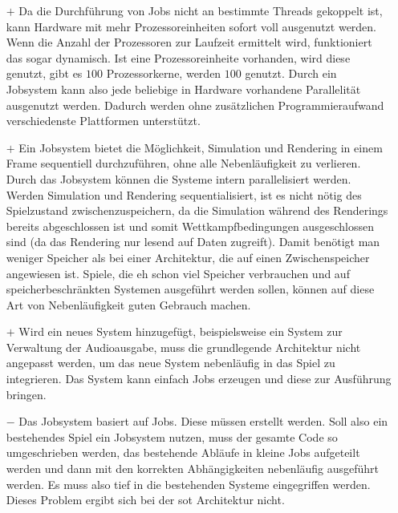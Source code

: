 \begin{itemize}
	\item[$+$]  Da die Durchführung von Jobs nicht an bestimmte Threads gekoppelt ist, kann Hardware mit mehr Prozessoreinheiten sofort voll ausgenutzt werden. Wenn die Anzahl der Prozessoren zur Laufzeit ermittelt wird, funktioniert das sogar dynamisch. Ist eine Prozessoreinheite vorhanden, wird diese genutzt, gibt es $100$ Prozessorkerne, werden $100$ genutzt. Durch ein Jobsystem kann also jede beliebige in Hardware vorhandene Parallelität ausgenutzt werden. Dadurch werden ohne zusätzlichen Programmieraufwand verschiedenste Plattformen unterstützt.
	\item[$+$] Ein Jobsystem bietet die Möglichkeit, Simulation und Rendering in einem Frame sequentiell durchzuführen, ohne alle Nebenläufigkeit zu verlieren. Durch das Jobsystem können die Systeme intern parallelisiert werden. Werden Simulation und Rendering sequentialisiert, ist es nicht nötig des Spielzustand zwischenzuspeichern, da die Simulation während des Renderings bereits abgeschlossen ist und somit Wettkampfbedingungen ausgeschlossen sind (da das Rendering nur lesend auf Daten zugreift). Damit benötigt man weniger Speicher als bei einer Architektur, die auf einen Zwischenspeicher angewiesen ist. Spiele, die eh schon viel Speicher verbrauchen und auf speicherbeschränkten Systemen ausgeführt werden sollen, können auf diese Art von Nebenläufigkeit guten Gebrauch machen.
	\item[$+$] Wird ein neues System hinzugefügt, beispielsweise ein System zur Verwaltung der Audioausgabe, muss die grundlegende Architektur nicht angepasst werden, um das neue System nebenläufig in das Spiel zu integrieren. Das System kann einfach Jobs erzeugen und diese zur Ausführung bringen.
	\item[$-$] Das Jobsystem basiert auf Jobs. Diese müssen erstellt werden. Soll also ein bestehendes Spiel ein Jobsystem nutzen, muss der gesamte Code so umgeschrieben werden, das bestehende Abläufe in kleine Jobs aufgeteilt werden und dann mit den korrekten Abhängigkeiten nebenläufig ausgeführt werden. Es muss also tief in die bestehenden Systeme eingegriffen werden. Dieses Problem ergibt sich bei der \ac{sot} Architektur nicht.
\end{itemize}